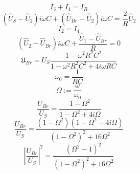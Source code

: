 \begin{equation}
I_3+I_4=I_R
\end{equation}
\begin{equation}
(\hat{U}_S-\hat{U}_2)i\omega C+(\hat{U}_{Br}-\hat{U}_2)i\omega C
= \frac{2}{R}\hat{U}_2
\end{equation}
\begin{equation}
I_2=I_4
\end{equation}
\begin{equation}
(\hat{U}_2-\hat{U}_{Br})i\omega C+\frac{\hat{U}_1-\hat{U}_{Br}}{R}=0
\end{equation}
\begin{equation}
\mathfrak{U}_{Br}=U_{S}\frac{1-\omega^2 R^2 C^2 }
{1-\omega^2 R^2 C^2 + 4i\omega R C}
\end{equation}
\begin{equation}
\omega_0=\frac{1}{RC}
\end{equation}
\begin{equation}
\Omega := \frac{\omega}{\omega_0}
\end{equation}
\begin{equation}
\frac{U_{Br}}{U_S}=\frac{1-\Omega^2}{1-\Omega^2 +4i\Omega}
\end{equation}
\begin{equation}
\frac{U_{Br}}{U_S}=\frac{(1-\Omega^2)(1-\Omega^2-4i\Omega)}{(1-\Omega^2)^2+16\Omega^2}
\end{equation}
\begin{equation}
\left|\frac{U_{Br}}{U_S}\right|^2=\frac{(\Omega^2-1)^2}{(1-\Omega^2)^2+16\Omega^2}
\end{equation}
